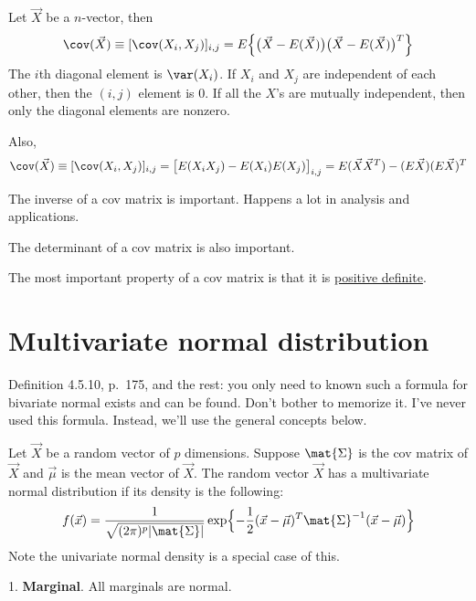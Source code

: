 \documentclass[12pt]{article}
\begin{document}
Let $\vec{X}$ be a $n$-vector, then
\[
\cov(\vec{X})
\equiv [\cov(X_i,X_j)]_{i,j}
= E \Bigl\{
    \bigl(\vec{X} - E(\vec{X})\bigr)
    \bigl(\vec{X} - E(\vec{X})\bigr)^T
    \Bigr\}
\]
The $i$th diagonal element is $\var(X_i)$.
If $X_i$ and $X_j$ are independent of each other,
then the $(i,j)$ element is 0.
If all the $X$'s are mutually independent, then only the diagonal
elements are nonzero.

Also,
\[
\cov(\vec{X})
\equiv [\cov(X_i,X_j)]_{i,j}
= \bigl[E(X_iX_j) - E(X_i)E(X_j)\bigr]_{i,j}
= E (\vec{X} \vec{X}^T)
  - (E\vec{X}) (E\vec{X})^T
\]

The inverse of a cov matrix is important. Happens a lot in
analysis and applications.

The determinant of a cov matrix is also important.

The most important property of a cov matrix is that it is
\underline{positive definite}.

\section{Multivariate normal distribution}

Definition 4.5.10, p.~175, and the rest: you only need to known such a
formula for bivariate normal exists and can be found.
Don't bother to memorize it. I've never used this formula.
Instead, we'll use the general concepts below.

Let $\vec{X}$ be a random vector of $p$ dimensions.
Suppose $\mat{\Sigma}$ is the cov matrix of $\vec{X}$
and $\vec{\mu}$ is the mean vector of $\vec{X}$.
The random vector $\vec{X}$ has a multivariate normal distribution
if its density is the following:
\[
f(\vec{x})
= \frac{1}{\sqrt{(2\pi)^p |\mat{\Sigma}|}}
    \exp\Bigl\{-\frac{1}{2}
        (\vec{x} - \vec{\mu})^T
        \mat{\Sigma}^{-1}
        (\vec{x} - \vec{\mu}) \Bigr\}
\]
Note the univariate normal density is a special case of this.

\alert[Properties]%
1. \textbf{Marginal}. All marginals are normal.
\end{document}
